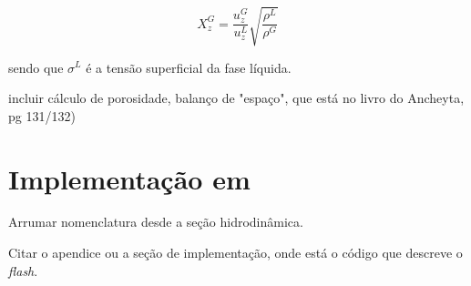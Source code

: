 \begin{equation}
X_{z}^G = \dfrac{u_{z}^G}{u_z^L} \sqrt{\dfrac{\rho^L}{\rho^G}}
\label{eq:X}
\end{equation}

sendo que $\sigma^L$ é a tensão superficial da fase líquida.


incluir cálculo de porosidade, balanço de "espaço", que está no livro do
Ancheyta, pg 131/132)

\section{Implementação em \emso} \label{sec:implementacao}

Arrumar nomenclatura desde a seção hidrodinâmica.

Citar o apendice ou a seção de implementação, onde está o código
que descreve o \emph{flash}.





































